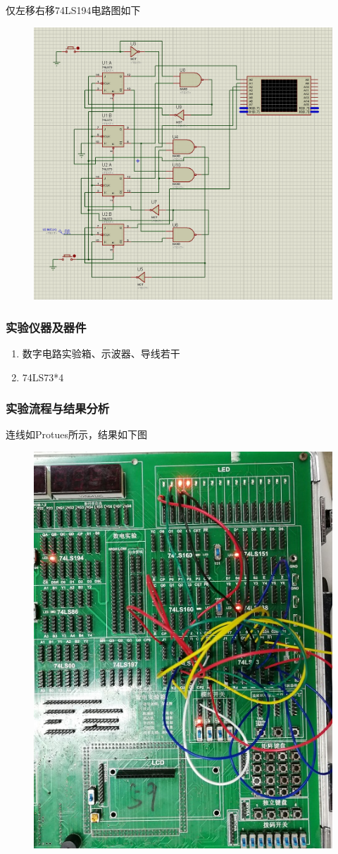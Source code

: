 \documentclass[11pt,UTF8]{ctexart}
\begin{document}
\par 仅左移右移74LS194电路图如下
\begin{figure}[H]
    \centering
    \includegraphics[width=0.6\linewidth]{fig/lsrs_circuit.PNG}
\end{figure}

\subsubsection{实验仪器及器件}
\begin{enumerate}
    \item 数字电路实验箱、示波器、导线若干
    \item 74LS73*4
\end{enumerate}

\subsubsection{实验流程与结果分析}
\par 连线如Protues所示，结果如下图
\begin{figure}[H]
    \centering
    \includegraphics[width=0.6\linewidth]{fig/lsrs.jpg}
\end{figure}
\end{document}
